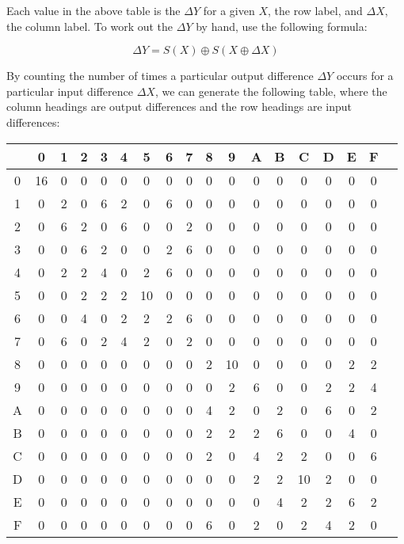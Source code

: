 Each value in the above table is the $\Delta Y$ for a given $X$, the
row label, and $\Delta X$, the column label. To work out the $\Delta Y$
by hand, use the following formula:

\begin{equation}
\Delta Y = S(X) \oplus S(X \oplus \Delta X)
\end{equation}

By counting the number of times a particular output difference $\Delta Y$
occurs for a particular input difference $\Delta X$, we can generate
the following table, where the column headings are output differences
and the row headings are input differences:

\begin{center}
\begin{tabular}{|c||c|c|c|c|c|c|c|c|c|c|c|c|c|c|c|c|c|}
\hline
& 0 & 1 & 2 & 3 & 4 & 5 & 6 & 7 & 8 & 9 & A & B & C & D & E & F \\\hline\hline
0 & 16 & 0 & 0 & 0 & 0 & 0 & 0 & 0 & 0 & 0 & 0 & 0 & 0 & 0 & 0 & 0 \\\hline
1 & 0 & 2 & 0 & 6 & 2 & 0 & 6 & 0 & 0 & 0 & 0 & 0 & 0 & 0 & 0 & 0 \\\hline
2 & 0 & 6 & 2 & 0 & 6 & 0 & 0 & 2 & 0 & 0 & 0 & 0 & 0 & 0 & 0 & 0 \\\hline
3 & 0 & 0 & 6 & 2 & 0 & 0 & 2 & 6 & 0 & 0 & 0 & 0 & 0 & 0 & 0 & 0 \\\hline
4 & 0 & 2 & 2 & 4 & 0 & 2 & 6 & 0 & 0 & 0 & 0 & 0 & 0 & 0 & 0 & 0 \\\hline
5 & 0 & 0 & 2 & 2 & 2 & 10 & 0 & 0 & 0 & 0 & 0 & 0 & 0 & 0 & 0 & 0 \\\hline
6 & 0 & 0 & 4 & 0 & 2 & 2 & 2 & 6 & 0 & 0 & 0 & 0 & 0 & 0 & 0 & 0 \\\hline
7 & 0 & 6 & 0 & 2 & 4 & 2 & 0 & 2 & 0 & 0 & 0 & 0 & 0 & 0 & 0 & 0 \\\hline
8 & 0 & 0 & 0 & 0 & 0 & 0 & 0 & 0 & 2 & 10 & 0 & 0 & 0 & 0 & 2 & 2 \\\hline
9 & 0 & 0 & 0 & 0 & 0 & 0 & 0 & 0 & 0 & 2 & 6 & 0 & 0 & 2 & 2 & 4 \\\hline
A & 0 & 0 & 0 & 0 & 0 & 0 & 0 & 0 & 4 & 2 & 0 & 2 & 0 & 6 & 0 & 2 \\\hline
B & 0 & 0 & 0 & 0 & 0 & 0 & 0 & 0 & 2 & 2 & 2 & 6 & 0 & 0 & 4 & 0 \\\hline
C & 0 & 0 & 0 & 0 & 0 & 0 & 0 & 0 & 2 & 0 & 4 & 2 & 2 & 0 & 0 & 6 \\\hline
D & 0 & 0 & 0 & 0 & 0 & 0 & 0 & 0 & 0 & 0 & 2 & 2 & 10 & 2 & 0 & 0 \\\hline
E & 0 & 0 & 0 & 0 & 0 & 0 & 0 & 0 & 0 & 0 & 0 & 4 & 2 & 2 & 6 & 2 \\\hline
F & 0 & 0 & 0 & 0 & 0 & 0 & 0 & 0 & 6 & 0 & 2 & 0 & 2 & 4 & 2 & 0 \\\hline
\end{tabular}
\end{center}

